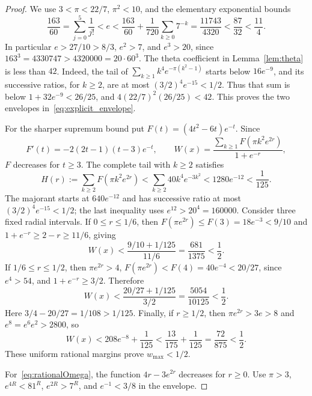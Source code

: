 \documentclass[11pt,a4paper]{article}
\numberwithin{equation}{section}
\theoremstyle{remark}
\begin{document}
\begin{proof}
We use $3<\pi<22/7$, $\pi^2<10$, and the elementary exponential bounds
\begin{equation}\label{eq:elementarye}
 \frac{163}{60}=\sum_{j=0}^5\frac1{j!}<e
 <\frac{163}{60}+\frac1{720}\sum_{k\ge0}7^{-k}
 =\frac{11743}{4320}<\frac{87}{32}<\frac{11}{4}.
\end{equation}
In particular $e>27/10>8/3$, $e^2>7$, and $e^3>20$, since
$163^3=4330747>4320000=20\cdot60^3$.
The theta coefficient in Lemma~\ref{lem:theta} is less than $42$. Indeed, the tail of
$\sum_{k\ge1}k^4e^{-\pi(k^2-1)}$ starts below $16e^{-9}$, and its successive ratios, for $k\ge2$, are at most
$(3/2)^4e^{-15}<1/2$. Thus that sum is below
$1+32e^{-9}<26/25$, and
$4(22/7)^2(26/25)<42$.
This proves the two envelopes in~\eqref{eq:explicit_envelope}.

For the sharper supremum bound put $F(t)=(4t^2-6t)e^{-t}$. Since
\[
 F'(t)=-2(2t-1)(t-3)e^{-t},\qquad
 W(x)=\frac{\sum_{k\ge1}F(\pi k^2e^{2r})}{1+e^{-r}},
\]
$F$ decreases for $t\ge3$. The complete tail with $k\ge2$ satisfies
\[
 H(r):=\sum_{k\ge2}F(\pi k^2e^{2r})
 <\sum_{k\ge2}40k^4e^{-3k^2}<1280e^{-12}<\frac1{125}.
\]
The majorant starts at $640e^{-12}$ and has successive ratio at most
$(3/2)^4e^{-15}<1/2$; the last inequality uses $e^{12}>20^4=160000$.
Consider three fixed radial intervals. If $0\le r\le1/6$, then
$F(\pi e^{2r})\le F(3)=18e^{-3}<9/10$ and
$1+e^{-r}\ge2-r\ge11/6$, giving
\[
 W(x)<\frac{9/10+1/125}{11/6}=\frac{681}{1375}<\frac12.
\]
If $1/6\le r\le1/2$, then $\pi e^{2r}>4$,
$F(\pi e^{2r})<F(4)=40e^{-4}<20/27$, since $e^4>54$,
and $1+e^{-r}\ge3/2$. Therefore
\[
 W(x)<\frac{20/27+1/125}{3/2}=\frac{5054}{10125}<\frac12.
\]
Here $3/4-20/27=1/108>1/125$. Finally, if $r\ge1/2$, then
$\pi e^{2r}>3e>8$ and $e^8=e^6e^2>2800$, so
\[
 W(x)<208e^{-8}+\frac1{125}
 <\frac{13}{175}+\frac1{125}=\frac{72}{875}<\frac12.
\]
These uniform rational margins prove $w_{\max}<1/2$.

For~\eqref{eq:rationalOmega}, the function $4r-3e^{2r}$ decreases for $r\ge0$. Use $\pi>3$, $e^{4R}<81^R$, $e^{2R}>7^R$, and $e^{-1}<3/8$ in the envelope.
\end{proof}
\end{document}
